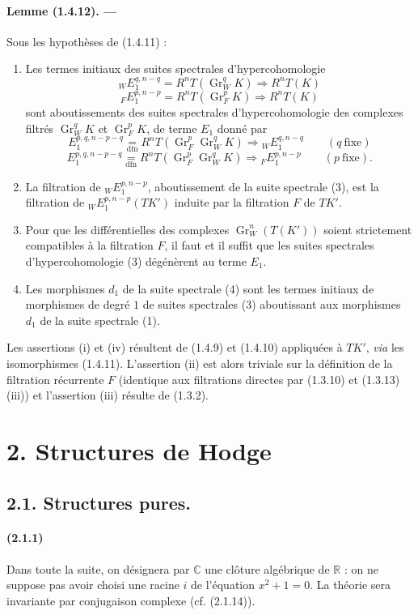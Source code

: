 \documentclass[10pt]{article}
\newcommand{\C}{\mathbb C}
\newcommand{\Gr}{\operatorname{Gr}}
\newcommand{\R}{\mathbb R}
\begin{document}
\paragraph{Lemme (1.4.12). ---} Sous les hypothèses de (1.4.11) :
\begin{enumerate}[label=(\roman*)]
\item Les termes initiaux des suites spectrales d'hypercohomologie
\[
\tag{1}
{}_WE_1^{q,n-q}=R^nT(\Gr_W^qK)\Rightarrow R^nT(K)
\]
\[
\tag{2}
{}_FE_1^{p,n-p}=R^nT(\Gr_F^pK)\Rightarrow R^nT(K)
\]
sont aboutissements des suites spectrales d'hypercohomologie des complexes filtrés $\Gr_W^qK$ et $\Gr_F^pK$, de terme $E_1$ donné par
\[
\tag{3}
E_1^{p,q,n-p-q}\underset{\mathrm{dfn}}{=}R^nT(\Gr_F^p\Gr_W^qK)\Rightarrow {}_WE_1^{q,n-q}\qquad(q\ \text{fixe})
\]
\[
\tag{4}
E_1^{p,q,n-p-q}\underset{\mathrm{dfn}}{=}R^nT(\Gr_F^p\Gr_W^qK)\Rightarrow {}_FE_1^{p,n-p}\qquad(p\ \text{fixe}).
\]
\item La filtration de ${}_WE_1^{p,n-p}$, aboutissement de la suite spectrale (3), est la filtration de ${}_WE_1^{p,n-p}(TK')$ induite par la filtration $F$ de $TK'$.
\item Pour que les différentielles des complexes $\Gr_W^n(T(K'))$ soient strictement compatibles à la filtration $F$, il faut et il suffit que les suites spectrales d'hypercohomologie (3) dégénèrent au terme $E_1$.
\item Les morphismes $d_1$ de la suite spectrale (4) sont les termes initiaux de morphismes de degré $1$ de suites spectrales (3) aboutissant aux morphismes $d_1$ de la suite spectrale (1).
\end{enumerate}
Les assertions (i) et (iv) résultent de (1.4.9) et (1.4.10) appliquées à $TK'$, \emph{via} les isomorphismes (1.4.11). L'assertion (ii) est alors triviale sur la définition de la filtration récurrente $F$ (identique aux filtrations directes par (1.3.10) et (1.3.13) (iii)) et l'assertion (iii) résulte de (1.3.2).

\section*{2. Structures de Hodge}
\subsection*{2.1. Structures pures.}

\paragraph{(2.1.1)} Dans toute la suite, on désignera par $\C$ une clôture algébrique de $\R$ : on ne suppose pas avoir choisi une racine $i$ de l'équation $x^2+1=0$. La théorie sera invariante par conjugaison complexe (cf. (2.1.14)).
\end{document}
